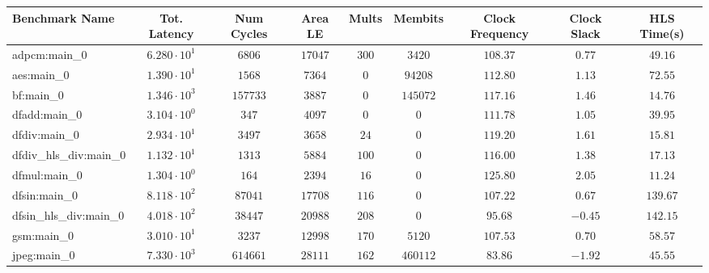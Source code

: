 \begin{tabular}{|l|c|c|c|c|c|c|c|c|}
\hline
Benchmark Name          & Tot. Latency           & Num Cycles  & Area LE    & Mults    & Membits    & Clock Frequency & Clock Slack & HLS Time(s) \\
\hline
adpcm:main\_0           & $ 6.280 \cdot 10^{1} $ & $ 6806    $ & $ 17047  $ & $ 300  $ & $ 3420   $ & $ 108.37      $ & $ 0.77    $ & $ 49.16   $ \\
aes:main\_0             & $ 1.390 \cdot 10^{1} $ & $ 1568    $ & $ 7364   $ & $ 0    $ & $ 94208  $ & $ 112.80      $ & $ 1.13    $ & $ 72.55   $ \\
bf:main\_0              & $ 1.346 \cdot 10^{3} $ & $ 157733  $ & $ 3887   $ & $ 0    $ & $ 145072 $ & $ 117.16      $ & $ 1.46    $ & $ 14.76   $ \\
dfadd:main\_0           & $ 3.104 \cdot 10^{0} $ & $ 347     $ & $ 4097   $ & $ 0    $ & $ 0      $ & $ 111.78      $ & $ 1.05    $ & $ 39.95   $ \\
dfdiv:main\_0           & $ 2.934 \cdot 10^{1} $ & $ 3497    $ & $ 3658   $ & $ 24   $ & $ 0      $ & $ 119.20      $ & $ 1.61    $ & $ 15.81   $ \\
dfdiv\_hls\_div:main\_0 & $ 1.132 \cdot 10^{1} $ & $ 1313    $ & $ 5884   $ & $ 100  $ & $ 0      $ & $ 116.00      $ & $ 1.38    $ & $ 17.13   $ \\
dfmul:main\_0           & $ 1.304 \cdot 10^{0} $ & $ 164     $ & $ 2394   $ & $ 16   $ & $ 0      $ & $ 125.80      $ & $ 2.05    $ & $ 11.24   $ \\
dfsin:main\_0           & $ 8.118 \cdot 10^{2} $ & $ 87041   $ & $ 17708  $ & $ 116  $ & $ 0      $ & $ 107.22      $ & $ 0.67    $ & $ 139.67  $ \\
dfsin\_hls\_div:main\_0 & $ 4.018 \cdot 10^{2} $ & $ 38447   $ & $ 20988  $ & $ 208  $ & $ 0      $ & $ 95.68       $ & $ -0.45   $ & $ 142.15  $ \\
gsm:main\_0             & $ 3.010 \cdot 10^{1} $ & $ 3237    $ & $ 12998  $ & $ 170  $ & $ 5120   $ & $ 107.53      $ & $ 0.70    $ & $ 58.57   $ \\
jpeg:main\_0            & $ 7.330 \cdot 10^{3} $ & $ 614661  $ & $ 28111  $ & $ 162  $ & $ 460112 $ & $ 83.86       $ & $ -1.92   $ & $ 45.55   $ \\

\end{tabular}
